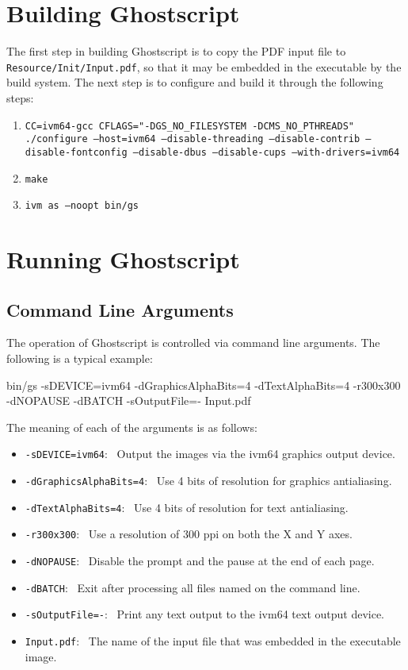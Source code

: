 \documentclass[a4paper,11pt]{article}
\newcommand{\code}[1]{\texttt{#1}}
\newenvironment{codeblock}{\begin{trivlist}\ttfamily
  \item }{\end{trivlist}}
\begin{document}
\section{Building Ghostscript}
\label{sec:building-ghostview}

The first step in building Ghostscript is to copy the PDF input file to \code{Resource/Init/Input.pdf}, so that it may be embedded in the executable by the build system.
The next step is to configure and build it through the following steps:
\begin{enumerate}
\item \code{CC=ivm64-gcc CFLAGS="-DGS\_NO\_FILESYSTEM -DCMS\_NO\_PTHREADS" ./configure --host=ivm64 --disable-threading --disable-contrib --disable-fontconfig --disable-dbus --disable-cups --with-drivers=ivm64}
\item \code{make}
\item \code{ivm as --noopt bin/gs}
\end{enumerate}

\section{Running Ghostscript}
\label{sec:running-ghostview}

\subsection{Command Line Arguments}

The operation of Ghostscript is controlled via command line arguments.
The following is a typical example:
\begin{codeblock}
bin/gs -sDEVICE=ivm64 -dGraphicsAlphaBits=4 -dTextAlphaBits=4 -r300x300 -dNOPAUSE -dBATCH -sOutputFile=- Input.pdf
\end{codeblock}
The meaning of each of the arguments is as follows:
\begin{itemize}
\item \code{-sDEVICE=ivm64}:~ Output the images via the ivm64 graphics output device.
\item \code{-dGraphicsAlphaBits=4}:~ Use 4 bits of resolution for graphics antialiasing.
\item \code{-dTextAlphaBits=4}:~ Use 4 bits of resolution for text antialiasing.
\item \code{-r300x300}:~ Use a resolution of 300 ppi on both the X and Y axes.
\item \code{-dNOPAUSE}:~ Disable the prompt and the pause at the end of each page.
\item \code{-dBATCH}:~ Exit after processing all files named on the command line.
\item \code{-sOutputFile=-}:~ Print any text output to the ivm64 text output device.
\item \code{Input.pdf}:~ The name of the input file that was embedded in the executable image.
\end{itemize}
\end{document}
